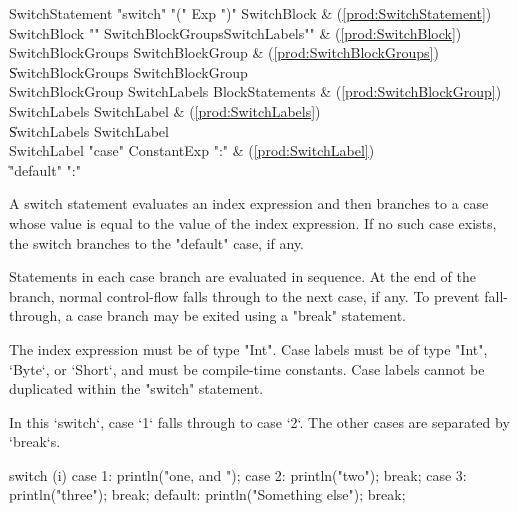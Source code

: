 \begin{bbgrammar}
     SwitchStatement \: \xcd"switch" \xcd"(" Exp \xcd")" SwitchBlock & (\ref{prod:SwitchStatement}) \\
         SwitchBlock \: \xcd"{" SwitchBlockGroups\opt SwitchLabels\opt \xcd"}" & (\ref{prod:SwitchBlock}) \\
   SwitchBlockGroups \: SwitchBlockGroup & (\ref{prod:SwitchBlockGroups}) \\
                     \| SwitchBlockGroups SwitchBlockGroup \\
    SwitchBlockGroup \: SwitchLabels BlockStatements & (\ref{prod:SwitchBlockGroup}) \\
        SwitchLabels \: SwitchLabel & (\ref{prod:SwitchLabels}) \\
                     \| SwitchLabels SwitchLabel \\
         SwitchLabel \: \xcd"case" ConstantExp \xcd":" & (\ref{prod:SwitchLabel}) \\
                     \| \xcd"default" \xcd":" \\
\end{bbgrammar}

A switch statement evaluates an index expression and then branches to
a case whose value is equal to the value of the index expression.
If no such case exists, the switch branches to the 
\xcd"default" case, if any.

Statements in each case branch are evaluated in sequence.  At the
end of the branch, normal control-flow falls through to the next case, if
any.  To prevent fall-through, a case branch may be exited using
a \xcd"break" statement.

The index expression must be of type \xcd"Int".
Case labels must be of type \xcd"Int", \xcd`Byte`, or \xcd`Short`, 
and must be compile-time 
constants.  Case labels cannot be duplicated within the
\xcd"switch" statement.

\begin{ex}
In this \xcd`switch`, case \xcd`1` falls through to case \xcd`2`.  The
other cases are separated by \xcd`break`s.
\begin{xten}
switch (i) {
  case 1: println("one, and ");
  case 2: println("two"); 
          break;
  case 3: println("three");
          break;
  default: println("Something else");
           break;
}
\end{xten}
\end{ex}

